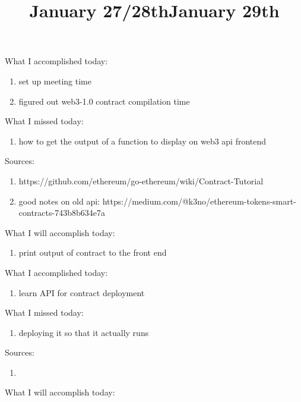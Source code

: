 What I accomplished today:

\begin{enumerate}
	\item set up meeting time
	\item figured out web3-1.0 contract compilation time
\end{enumerate}

What I missed today:

\begin{enumerate}
	\item how to get the output of a function to display on web3 api frontend
\end{enumerate}


Sources:

\begin{enumerate}
	\item https://github.com/ethereum/go-ethereum/wiki/Contract-Tutorial
	\item good notes on old api: https://medium.com/@k3no/ethereum-tokens-smart-contracts-743b8b634e7a
\end{enumerate}





\title{January 27/28th}

What I will accomplish today:

\begin{enumerate}
	\item print output of contract to the front end
\end{enumerate}

What I accomplished today:

\begin{enumerate}
	\item learn API for contract deployment
\end{enumerate}

What I missed today:

\begin{enumerate}
	\item deploying it so that it actually runs
\end{enumerate}

Sources:

\begin{enumerate}
	\item 
\end{enumerate}

\title{January 29th}

What I will accomplish today:

